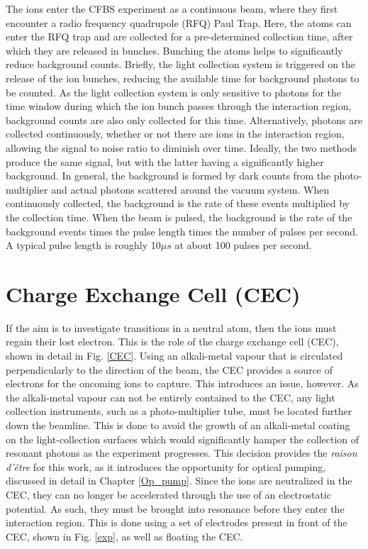 The ions enter the CFBS experiment as a continuous beam, where they first encounter a radio frequency quadrupole (RFQ) Paul Trap\cite{CFBS}. Here, the atoms can enter the RFQ trap and are collected for a pre-determined collection time, after which they are released in bunches. Bunching the atoms helps to significantly reduce background counts. Briefly, the light collection system is triggered on the release of the ion bunches, reducing the available time for background photons to be counted. As the light collection system is only sensitive to photons for the time window during which the ion bunch passes through the interaction region, background counts are also only collected for this time. Alternatively, photons are collected continuously, whether or not there are ions in the interaction region, allowing the signal to noise ratio to diminish over time. Ideally, the two methods produce the same signal, but with the latter having a significantly higher background. In general, the background is formed by dark counts from the photo-multiplier and actual photons scattered around the vacuum system. When continuously collected, the background is the rate of these events multiplied by the collection time. When the beam is pulsed, the background is the rate of the background events times the pulse length times the number of pulses per second. A typical pulse length is roughly 10$\mu s$ at about 100 pulses per second\cite{CFBS}.

\section{Charge Exchange Cell (CEC)}
If the aim is to investigate transitions in a neutral atom, then the ions must regain their lost electron. This is the role of the charge exchange cell (CEC), shown in detail in Fig. \ref{CEC}. Using an alkali-metal vapour that is circulated perpendicularly to the direction of the beam, the CEC provides a source of electrons for the oncoming ions to capture. This introduces an issue, however. As the alkali-metal vapour can not be entirely contained to the CEC, any light collection instruments, such as a photo-multiplier tube,  must be located further down the beamline. This is done to avoid the growth of an alkali-metal coating on the light-collection surfaces which would significantly hamper the collection of resonant photons as the experiment progresses. This decision provides the \emph{raison d'être} for this work, as it introduces the opportunity for optical pumping, discussed in detail in Chapter \ref{Op_pump}. Since the ions are neutralized in the CEC, they can no longer be accelerated through the use of an electrostatic potential. As such, they must be brought into resonance before they enter the interaction region. This is done using a set of electrodes present in front of the CEC, shown in Fig. \ref{exp}, as well as floating the CEC.

